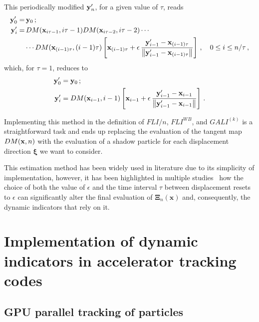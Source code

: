 This periodically modified $\vb{y}'_n$, for a given value of $\tau$, reads
\begin{equation}
    \begin{aligned}
        \vb{y}'_0 =&\, \vb{y}_0 \,;  \\
        \vb{y}'_i =&\, DM(\vb{x}_{i\tau - 1}, i\tau - 1)DM(\vb{x}_{i\tau - 2}, i\tau - 2)\cdots \\
        &\cdots DM(\vb{x}_{(i-1)\tau}, (i-1)\tau)\left[\vb{x}_{(i-1)\tau}+\epsilon\,\frac{\vb{y}'_{i-1}-\vb{x}_{(i-1)\tau}}{\norm{\vb{y}'_{i-1}-\vb{x}_{(i-1)\tau}}}\right]\,, \quad 0 \leq i \leq n/\tau \,,        
    \end{aligned}
\end{equation}
which, for $\tau=1$, reduces to
\begin{equation}
\begin{aligned}
    \vb{y}'_0 &= \vb{y}_0 \,; \\
    \vb{y}'_i &= DM(\vb{x}_{i-1}, i-1)\left[\vb{x}_{i-1}+\epsilon\,\frac{\vb{y}'_{i-1}-\vb{x}_{i-1}}{\norm{\vb{y}'_{i-1}-\vb{x}_{i-1}}}\right]\,.
\end{aligned}
\end{equation}

Implementing this method in the definition of $FLI/n$, $FLI^{WB}$, and $GALI^{(k)}$ is a straightforward task and ends up replacing the evaluation of the tangent map $DM(\vb{x}, n)$ with the evaluation of a shadow particle for each displacement direction $\boldsymbol{\xi}$ we want to consider.

This estimation method has been widely used in literature due to its simplicity of implementation, however, it has been highlighted in multiple studies~\cite{Tancredi_2001, Skokos2010b} how the choice of both the value of $\epsilon$ and the time interval $\tau$ between displacement resets to $\epsilon$ can significantly alter the final evaluation of $\boldsymbol{\Xi}_{n}(\mathbf{x})$ and, consequently, the dynamic indicators that rely on it.


\section{Implementation of dynamic indicators in accelerator tracking codes} \label{sec:implement}
%

\subsection{GPU parallel tracking of particles}

